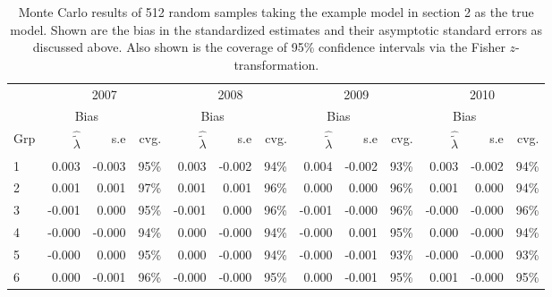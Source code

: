 \documentclass[a4paper,11pt]{article}
\renewcommand{\l}{\lambda}
\newcommand{\0}{\boldsymbol{0}}
\begin{document}
\begin{table}\begin{small}
\begin{tabular}{lrrrrrrrrrrrr}
 \hline  \hline
& \multicolumn{3}{c}{2007} & \multicolumn{3}{c}{2008} & \multicolumn{3}{c}{2009} & \multicolumn{3}{c}{2010}\\
 \cline{2-13}
&	     \multicolumn{2}{c}{Bias} &  & \multicolumn{2}{c}{Bias} &  &\multicolumn{2}{c}{Bias} &  &\multicolumn{2}{c}{Bias} &  \\
\cline{2-3} \cline{5-6} \cline{8-9} \cline{11-12}
Grp&   $\hat{\tilde\l}$ & s.e & cvg. &$\hat{\tilde\l}$ & s.e & cvg. &$\hat{\tilde\l}$ & s.e & cvg. &$\hat{\tilde\l}$ & s.e & cvg. \\
  \hline
  1   &0.003 & -0.003& 95\%&0.003 & -0.002& 94\%&0.004 & -0.002& 93\%&0.003 & -0.002& 94\%\\
  2    &0.001 & 0.001& 97\%&0.001 & 0.001& 96\%&0.000 & 0.000& 96\%&0.001 & 0.000& 94\%\\
  3   &-0.001 & 0.000& 95\%&-0.001 & 0.000& 96\%&-0.001 & -0.000& 96\%&-0.000 & -0.000& 96\%\\
  4   &-0.000 & -0.000& 94\%&0.000 & -0.000& 94\%&-0.000 & 0.001& 95\%&0.000 & -0.000& 94\%\\
  5   &-0.000 & 0.000& 95\%&0.000 & -0.000& 94\%&-0.000 & -0.001& 93\%&-0.000 & -0.000& 93\%\\
  6   &0.000 & -0.001& 96\%&-0.000 & -0.000& 95\%&0.000 & -0.001& 95\%&0.001 & -0.000& 95\%\\
  \hline     \hline
\end{tabular}\end{small}
\caption{Monte Carlo results of 512 random samples taking the example model in section 2 as the true model.
Shown are the bias in the standardized estimates and their asymptotic standard errors as discussed above. 
Also shown is the coverage of 95\% confidence intervals via the Fisher $z$-transformation.}\label{tab:montecarlo}
\end{table}





\end{document}
